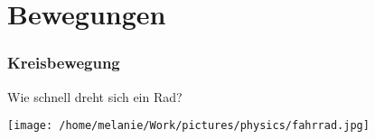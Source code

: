 \documentclass{beamer}
\begin{document}

\section{Bewegungen} 


\begin{frame}
\end{frame}

\begin{frame}
\end{frame}

\begin{frame}
\end{frame}

\begin{frame}
\end{frame}
\begin{frame}
\end{frame}

\begin{frame}
\end{frame}

\begin{frame}
\end{frame}

\begin{frame}
\end{frame}

\begin{frame}
\end{frame}





\begin{frame}
\frametitle{Kreisbewegung}

Wie schnell dreht sich ein Rad?

\begin{center}
\texttt{[image: /home/melanie/Work/pictures/physics/fahrrad.jpg]}
\end{center}

\end{frame}
\end{document}
